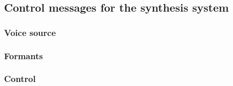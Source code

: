 \subsection{Control messages for the synthesis system}
\label{x:messages}

\subsubsection{Voice source}

\subsubsection{Formants}

\subsubsection{Control}